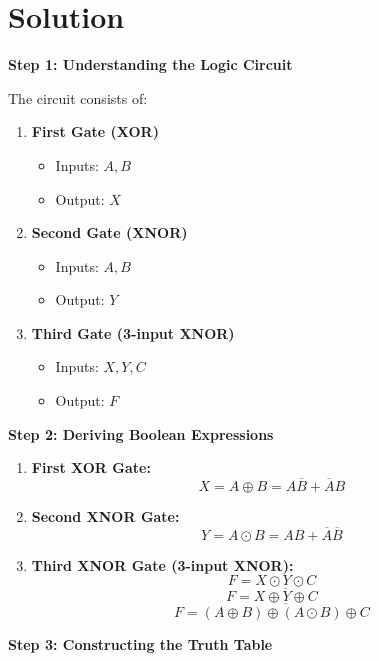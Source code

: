 \documentclass[a4paper,12pt]{article}
\begin{document}
\section*{Solution}

\textbf{Step 1: Understanding the Logic Circuit}

The circuit consists of:

\begin{enumerate}
    \item \textbf{First Gate (XOR)}  
    \begin{itemize}
        \item Inputs: $A, B$
        \item Output: $X$
    \end{itemize}
    
    \item \textbf{Second Gate (XNOR)}  
    \begin{itemize}
        \item Inputs: $A, B$
        \item Output: $Y$
    \end{itemize}
    
    \item \textbf{Third Gate (3-input XNOR)}  
    \begin{itemize}
        \item Inputs: $X, Y, C$
        \item Output: $F$
        \end{itemize}
\end{enumerate}

\hrulefill

\textbf{Step 2: Deriving Boolean Expressions}

\begin{enumerate}
    \item \textbf{First XOR Gate:}
\[
    X = A \oplus B = A\overline{B} + \overline{A}B
\]
    
    \item \textbf{Second XNOR Gate:}
\[
    Y = A \odot B = AB + \overline{A} \overline{B}
\]

    \item \textbf{Third XNOR Gate (3-input XNOR):}
\[
    F = X \odot Y \odot C
\]
\[
    F = \overline{X \oplus Y \oplus C}
\]
\[
    F = \overline{(A \oplus B) \oplus (A \odot B) \oplus C}
\]
\end{enumerate}

\hrulefill

\textbf{Step 3: Constructing the Truth Table}
\end{document}

